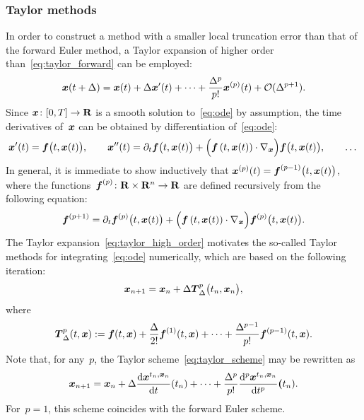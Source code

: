 \subsubsection*{Taylor methods}%
In order to construct a method with a smaller local truncation error than that of the forward Euler method,
a Taylor expansion of higher order than~\eqref{eq:taylor_forward} can be employed:
\begin{equation}
    \label{eq:taylor_high_order}
    \mathbf{\boldsymbol{x}}(t + \Delta) = \mathbf{\boldsymbol{x}}(t)
    + \Delta \mathbf{\boldsymbol{x}}'(t)
    + \dotsb
    + \frac{\Delta^p}{p!} \mathbf{\boldsymbol{x}}^{(p)}(t)
    + \mathcal O(\Delta^{p+1}).
\end{equation}
Since $\mathbf{\boldsymbol{x}}\colon [0, T] \to \mathbf R$ is a smooth solution to~\eqref{eq:ode} by assumption,
the time derivatives of~$\mathbf{\boldsymbol{x}}$ can be obtained by differentiation of~\eqref{eq:ode}:
\[
    \mathbf{\boldsymbol{x}}'(t) = \mathbf{\boldsymbol{f}}\bigl(t, \mathbf{\boldsymbol{x}}(t)\bigr),
    \qquad
    \mathbf{\boldsymbol{x}}''(t) = \partial_t \mathbf{\boldsymbol{f}}\bigl(t, \mathbf{\boldsymbol{x}}(t)\bigr)
    + \Bigl( \mathbf{\boldsymbol{f}}\left(t, \mathbf{\boldsymbol{x}}(t)\right) \cdot \nabla_{\mathbf{\boldsymbol{x}}} \Bigr) \mathbf{\boldsymbol{f}}\bigl( t, \mathbf{\boldsymbol{x}}(t) \bigr),
    \qquad
    \dotsc
\]
In general, it is immediate to show inductively that $\mathbf{\boldsymbol{x}}^{(p)}(t) = \mathbf{\boldsymbol{f}}^{(p-1)}\bigl(t, \mathbf{\boldsymbol{x}}(t)\bigr)$,
where the functions~$\mathbf{\boldsymbol{f}}^{(p)}\colon \mathbf R \times \mathbf R^n \to \mathbf R$ are defined recursively from the following equation:
\[
    \mathbf{\boldsymbol{f}}^{(p+1)} = \partial_t \mathbf{\boldsymbol{f}}^{(p)}\bigl(t, \mathbf{\boldsymbol{x}}(t)\bigr) + \Bigl( \mathbf{\boldsymbol{f}}\left(t, \mathbf{\boldsymbol{x}}(t)\right) \cdot \nabla_{\mathbf{\boldsymbol{x}}} \Bigr) \mathbf{\boldsymbol{f}}^{(p)}\bigl( t, \mathbf{\boldsymbol{x}}(t) \bigr).
\]
The Taylor expansion~\eqref{eq:taylor_high_order} motivates the so-called Taylor methods for integrating~\eqref{eq:ode} numerically,
which are based on the following iteration:
\begin{equation}
    \label{eq:taylor_scheme}
    \mathbf{\boldsymbol{x}}_{n+1} = \mathbf{\boldsymbol{x}}_n + \Delta \mathbf{\boldsymbol{T}}^{p}_{\Delta}\bigl(t_n, \mathbf{\boldsymbol{x}}_n\bigr),
\end{equation}
where
\[
    \mathbf{\boldsymbol{T}}^p_{\Delta}(t, \mathbf{\boldsymbol{x}})
    := \mathbf{\boldsymbol{f}}(t, \mathbf{\boldsymbol{x}}) + \frac{\Delta}{2!} \mathbf{\boldsymbol{f}}^{(1)}(t, \mathbf{\boldsymbol{x}})
    + \dotsb + \frac{\Delta^{p-1}}{p!} \mathbf{\boldsymbol{f}}^{(p-1)}(t, \mathbf{\boldsymbol{x}}).
\]
Note that, for any~$p$,
the Taylor scheme~\eqref{eq:taylor_scheme} may be rewritten as
\[
    \mathbf{\boldsymbol{x}}_{n+1} = \mathbf{\boldsymbol{x}}_n
    + \Delta \frac{\mathrm d \mathbf{\boldsymbol{x}}^{t_n, \mathbf{\boldsymbol{x}}_n}}{\mathrm d t} (t_n)
    + \dotsb
    + \frac{\Delta^p}{p!} \frac{\mathrm d^p \mathbf{\boldsymbol{x}}^{t_n, \mathbf{\boldsymbol{x}}_n}}{\mathrm d t^{p}} \mathbf{\boldsymbol{(}}t_n).
\]
For~$p=1$, this scheme coincides with the forward Euler scheme.


